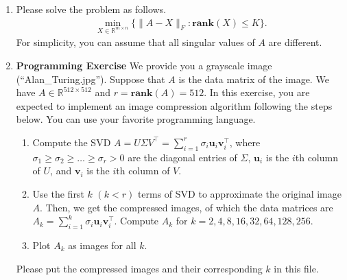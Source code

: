 \documentclass[11pt,letter,notitlepage]{article}
\newcommand{\rank}[1]{ \textbf{rank}  (#1)  }
\begin{document}
\begin{exercise}
\begin{enumerate}
        \item Please solve the problem as follows.
              \begin{align*}
                  \min_{X\in\mathbb{R}^{m\times n}}\{\|A-X\|_F:\rank{X}\leq K\}.
              \end{align*}
              For simplicity, you can assume that all singular values of $A$ are different.

        \item \textbf{Programming Exercise} We provide you a grayscale image (``Alan\_Turing.jpg''). Suppose that $A$ is the data matrix of the image. We have $A\in\mathbb{R}^{512\times 512}$ and $r=\rank A=512$. In this exercise, you are expected to implement an image compression algorithm following the steps below. You can use your favorite programming language.
              \begin{enumerate}
                  \item Compute the SVD $A=U\Sigma V^\top=\sum_{i=1}^r\sigma_i\textbf{u}_i\textbf{v}_i^\top$, where $\sigma_1\ge \sigma_2\ge \dots\ge \sigma_r>0$ are the diagonal entries of $\Sigma$, $\textbf{u}_i$ is the $i$th column of $U$, and $\textbf{v}_i$ is the $i$th column of $V$.
                  \item Use the first $k$ $(k< r)$ terms of SVD to approximate the original image $A$. Then, we get the compressed images, of which the data matrices are $A_k=\sum_{i=1}^k\sigma_i\textbf{u}_i\textbf{v}_i^\top$. Compute $A_k$ for $k=2,4,8,16,32,64,128,256$.
                  \item Plot $A_k$ as images for all $k$.
              \end{enumerate}
              Please put the compressed images and their corresponding $k$ in this file.

    \end{enumerate}
\end{exercise}
\end{document}
